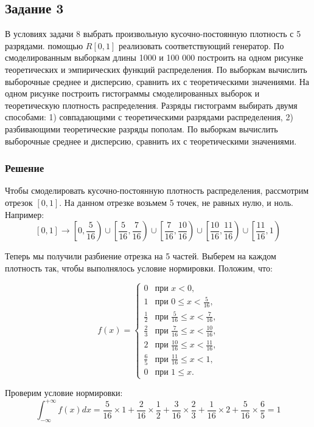 \documentclass{article}
\begin{document}
\subsection{Задание 3}
В условиях задачи 8 выбрать произвольную кусочно-постоянную плотность с 5 разрядами. 
помощью $R[0,1]$ реализовать соответствующий генератор. По смоделированным выборкам длины
1000 и 100 000 построить на одном рисунке теоретических и эмпирических функций
распределения. По выборкам вычислить выборочные среднее и дисперсию, сравнить их с 
теоретическими значениями. На одном рисунке построить гистограммы смоделированных выборок
и теоретическую плотность распределения. Разряды гистограмм выбирать двумя способами: 1)
совпадающими с теоретическими разрядами распределения, 2) разбивающими теоретические 
разряды пополам. По выборкам вычислить выборочные среднее и дисперсию, сравнить их с
теоретическими значениями.
\subsubsection{Решение}
Чтобы смоделировать кусочно-постоянную плотность распределения, рассмотрим отрезок 
$[0, 1]$. На данном отрезке возьмем 5 точек, не равных нулю, и ноль. Например:
\[[0, 1] \to \left[0, \frac{5}{16}\right) \cup \left[\frac{5}{16}, \frac{7}{16}\right)
\cup \left[\frac{7}{16}, \frac{10}{16}\right) \cup \left[\frac{10}{16},
\frac{11}{16}\right) \cup \left[\frac{11}{16}, 1\right) \]

Теперь мы получили разбиение отрезка на 5 частей. Выберем на каждом плотность так, чтобы
выполнялось условие нормировки. Положим, что:

\begin{equation*}
    f(x) =     
    \begin{cases}
        0 &\text{при $x < 0$,}\\
        1 &\text{при $0 \le x < \frac{5}{16}$,}\\
        \frac{1}{2} &\text{при $\frac{5}{16} \le x < \frac{7}{16}$,}\\
        \frac{2}{3} &\text{при $\frac{7}{16} \le x < \frac{10}{16}$,}\\
        2 &\text{при $\frac{10}{16} \le x < \frac{11}{16}$,}\\
        \frac{6}{5} &\text{при $\frac{11}{16} \le x < 1$,}\\
        0 &\text{при $1 \le x$.}
    \end{cases}
\end{equation*}

Проверим условие нормировки:
\[\int_{-\infty}^{+\infty}f(x)dx = \frac{5}{16}\times1+\frac{2}{16}\times\frac{1}{2}+
\frac{3}{16}\times\frac{2}{3}+\frac{1}{16}\times2+\frac{5}{16}\times\frac{6}{5}
= 1\]
\end{document}
